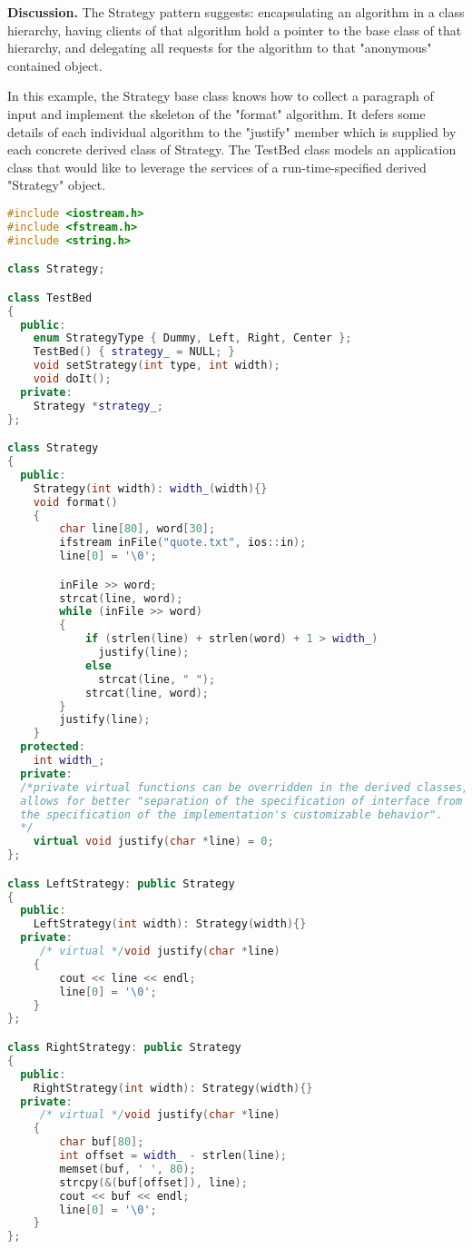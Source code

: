 \documentclass{book}
\begin{document}
\textbf{Discussion.} The Strategy pattern suggests: encapsulating an algorithm in a class hierarchy, having clients of that algorithm hold a pointer to the base class of that hierarchy, 
and delegating all requests for the algorithm to that "anonymous" contained object.

In this example, the Strategy base class knows how to collect a paragraph of input and implement the skeleton of the "format" algorithm.
It defers some details of each individual algorithm to the "justify" member which is supplied by each concrete derived class of Strategy.
The TestBed class models an application class that would like to leverage the services of a run-time-specified derived "Strategy" object.

\begin{lstlisting}[caption={Strategy Pattern Sample 3}, language=C++]
#include <iostream.h>
#include <fstream.h>
#include <string.h>

class Strategy;

class TestBed
{
  public:
    enum StrategyType { Dummy, Left, Right, Center };
    TestBed() { strategy_ = NULL; }
    void setStrategy(int type, int width);
    void doIt();
  private:
    Strategy *strategy_;
};

class Strategy
{
  public:
    Strategy(int width): width_(width){}
    void format()
    {
        char line[80], word[30];
        ifstream inFile("quote.txt", ios::in);
        line[0] = '\0';

        inFile >> word;
        strcat(line, word);
        while (inFile >> word)
        {
            if (strlen(line) + strlen(word) + 1 > width_)
              justify(line);
            else
              strcat(line, " ");
            strcat(line, word);
        }
        justify(line);
    }
  protected:
    int width_;
  private:
  /*private virtual functions can be overridden in the derived classes,
  allows for better "separation of the specification of interface from 
  the specification of the implementation's customizable behavior".
  */
    virtual void justify(char *line) = 0;
};

class LeftStrategy: public Strategy
{
  public:
    LeftStrategy(int width): Strategy(width){}
  private:
     /* virtual */void justify(char *line)
    {
        cout << line << endl;
        line[0] = '\0';
    }
};

class RightStrategy: public Strategy
{
  public:
    RightStrategy(int width): Strategy(width){}
  private:
     /* virtual */void justify(char *line)
    {
        char buf[80];
        int offset = width_ - strlen(line);
        memset(buf, ' ', 80);
        strcpy(&(buf[offset]), line);
        cout << buf << endl;
        line[0] = '\0';
    }
};


\end{lstlisting}
\end{document}
